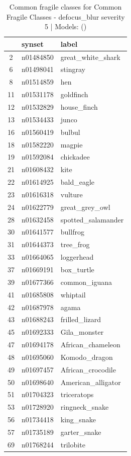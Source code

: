 \begin{table}
\caption{Common fragile classes for Common Fragile Classes - defocus_blur severity 5 | Models: ()}
\label{tab:Common Fragile Classes - defocus_blur severity 5_d41d8cd9}
\begin{tabular}{cll}
\toprule
 & synset & label \\
\midrule
2 & n01484850 & great_white_shark \\
6 & n01498041 & stingray \\
8 & n01514859 & hen \\
11 & n01531178 & goldfinch \\
12 & n01532829 & house_finch \\
13 & n01534433 & junco \\
16 & n01560419 & bulbul \\
18 & n01582220 & magpie \\
19 & n01592084 & chickadee \\
21 & n01608432 & kite \\
22 & n01614925 & bald_eagle \\
23 & n01616318 & vulture \\
24 & n01622779 & great_grey_owl \\
28 & n01632458 & spotted_salamander \\
30 & n01641577 & bullfrog \\
31 & n01644373 & tree_frog \\
33 & n01664065 & loggerhead \\
37 & n01669191 & box_turtle \\
39 & n01677366 & common_iguana \\
41 & n01685808 & whiptail \\
42 & n01687978 & agama \\
43 & n01688243 & frilled_lizard \\
45 & n01692333 & Gila_monster \\
47 & n01694178 & African_chameleon \\
48 & n01695060 & Komodo_dragon \\
49 & n01697457 & African_crocodile \\
50 & n01698640 & American_alligator \\
51 & n01704323 & triceratops \\
53 & n01728920 & ringneck_snake \\
56 & n01734418 & king_snake \\
57 & n01735189 & garter_snake \\
69 & n01768244 & trilobite \\

\end{tabular}
\end{table}
